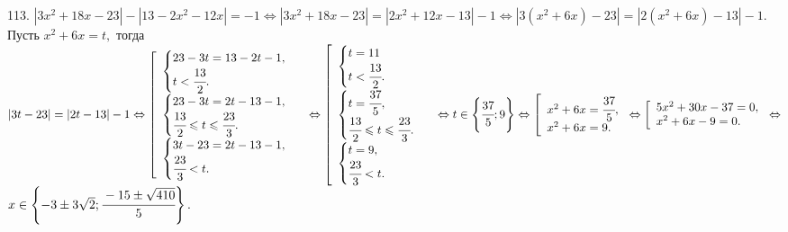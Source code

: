 113. $|3x^2+18x-23|-|13-2x^2-12x|=-1\Leftrightarrow |3x^2+18x-23|=|2x^2+12x-13|-1\Leftrightarrow |3(x^2+6x)-23|=|2(x^2+6x)-13|-1.$ Пусть $x^2+6x=t,$ тогда $|3t-23|=|2t-13|-1\Leftrightarrow \left[\begin{array}{l}\begin{cases} 23-3t=13-2t-1,\\ t<\cfrac{13}{2}.\end{cases}\\ \begin{cases} 23-3t=2t-13-1,\\ \cfrac{13}{2}\leqslant t\leqslant\cfrac{23}{3}.\end{cases}\\ \begin{cases} 3t-23=2t-13-1,\\ \cfrac{23}{3}<t.\end{cases}\end{array}\right.\Leftrightarrow \left[\begin{array}{l}\begin{cases} t=11\\ t<\cfrac{13}{2}.\end{cases}\\ \begin{cases} t=\cfrac{37}{5},\\ \cfrac{13}{2}\leqslant t\leqslant\cfrac{23}{3}.\end{cases}\\ \begin{cases} t=9,\\ \cfrac{23}{3}<t.\end{cases}\end{array}\right.\Leftrightarrow
t\in\left\{\cfrac{37}{5};9\right\}\Leftrightarrow
\left[\begin{array}{l}x^2+6x=\cfrac{37}{5},\\ x^2+6x=9.\end{array}\right.\Leftrightarrow
\left[\begin{array}{l}5x^2+30x-37=0,\\ x^2+6x-9=0.\end{array}\right.\Leftrightarrow$\\$
x\in\left\{-3\pm3\sqrt{2};\cfrac{-15\pm\sqrt{410}}{5}\right\}.$\\
